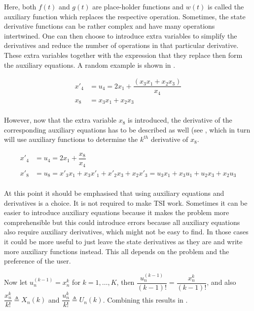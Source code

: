 \noindent
Here, both $f\left(t\right)$ and $g\left(t\right)$ are place-holder functions and $w\left(t\right)$ is called the auxiliary function which replaces the respective operation. Sometimes, the state derivative functions can be rather complex and have many operations intertwined. One can then choose to introduce extra variables to simplify the derivatives and reduce the number of operations in that particular derivative. These extra variables together with the expression that they replace then form the auxiliary equations. A random example is shown in .

\begin{equation} \label{eq:auxEqExample}
\begin{split}
x'_{4} &= u_{4} = 2x_{1}+\dfrac{\left(x_{3}x_{1}+x_{2}x_{3}\right)}{x_{4}} \\
x_{8} &= x_{3}x_{1}+x_{2}x_{3} \\
\end{split}
\end{equation}

\noindent
However, now that the extra variable $x_{8}$ is introduced, the derivative of the corresponding auxiliary equations has to be described as well (see , which in turn will use auxiliary functions to determine the $k^{th}$ derivative of $x_{8}$.

\begin{equation} \label{eq:auxDerExample}
\begin{split}
x'_{4} &= u_{4} = 2x_{1}+\dfrac{x_{8}}{x_{4}} \\
x'_{8} &= u_{8} =  x'_{3}x_{1}+x_{3}x'_{1}+x'_{2}x_{3}+x_{2}x'_{3} = u_{3}x_{1}+x_{3}u_{1}+u_{2}x_{3}+x_{2}u_{3} \\
\end{split}
\end{equation}

\noindent
At this point it should be emphasised that using auxiliary equations and derivatives is a choice. It is not required to make \ac{TSI} work. Sometimes it can be easier to introduce auxiliary equations because it makes the problem more comprehensible but this could introduce errors because all auxiliary equations also require auxiliary derivatives, which might not be easy to find. In those cases it could be more useful to just leave the state derivatives as they are and write more auxiliary functions instead. This all depends on the problem and the preference of the user. 

\noindent
Now let $u_{n}^{\left(k-1\right)}=x_{n}^{k}$ for $k=1,\dots,K$, then $\dfrac{u_{n}^{\left(k-1\right)}}{\left(k-1\right)!}=\dfrac{x_{n}^{k}}{\left(k-1\right)!}$, and also $\dfrac{x_{n}^{k}}{k!}\triangleq X_{n}\left(k\right)$ and $\dfrac{u_{n}^{k}}{k!}\triangleq U_{n}\left(k\right)$. Combining this results in .


